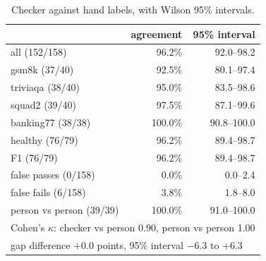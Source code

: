 \documentclass{article}
\begin{document}
\begin{table}[h]
  \centering\small
  \caption{Checker against hand labels, with Wilson 95\% intervals.}
  \label{tab:hand}
  \begin{tabular}{lrr}
    \toprule
    & agreement & 95\% interval \\
    \midrule
    all (152/158) & 96.2\% & 92.0--98.2 \\
    \textsf{gsm8k} (37/40) & 92.5\% & 80.1--97.4 \\
    \textsf{triviaqa} (38/40) & 95.0\% & 83.5--98.6 \\
    \textsf{squad2} (39/40) & 97.5\% & 87.1--99.6 \\
    \textsf{banking77} (38/38) & 100.0\% & 90.8--100.0 \\
    healthy (76/79) & 96.2\% & 89.4--98.7 \\
    F1 (76/79) & 96.2\% & 89.4--98.7 \\
    \midrule
    false passes (0/158) & 0.0\% & 0.0--2.4 \\
    false fails (6/158) & 3.8\% & 1.8--8.0 \\
    person vs person (39/39) & 100.0\% & 91.0--100.0 \\
    \midrule
    \multicolumn{3}{l}{Cohen's $\kappa$: checker vs person 0.90, person vs person 1.00} \\
    \multicolumn{3}{l}{gap difference $+0.0$ points, 95\% interval $-6.3$ to $+6.3$} \\
    \bottomrule
  \end{tabular}
\end{table}
\end{document}
